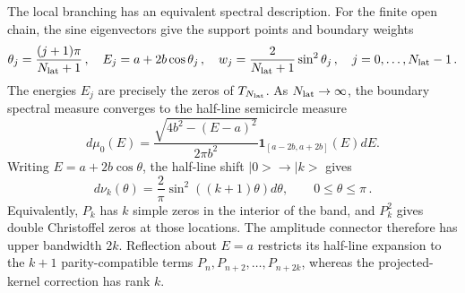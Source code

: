 \documentclass[a4paper,11pt]{article}
\def\ket#1{|#1>}%
\def\dd{d}%
\theoremstyle{definition}
\theoremstyle{remark}
\newcommand{\ket}[1]{|#1\rangle}
\newcommand{\dd}{\mathrm d}
\begin{document}
The local branching has an equivalent spectral description. For the finite open chain, the sine eigenvectors give the support points and boundary weights
\begin{equation}
   \theta_j=\frac{(j+1)\pi}{N_{\rm lat}+1}\,,\quad
   E_j=a+2b\cos\theta_j\,,\quad
   w_j=\frac{2}{N_{\rm lat}+1}\sin^2\theta_j\,,
   \quad j=0,\ldots,N_{\rm lat}-1\,.
   \label{eq:tight-binding-spectrum-main}
\end{equation}
The energies $E_j$ are precisely the zeros of $T_{N_{\rm lat}}$. As \(N_{\rm lat}\to\infty\), the boundary spectral measure converges to the half-line semicircle measure
\begin{equation}
   \dd\mu_0(E)=
   \frac{\sqrt{4b^2-(E-a)^2}}{2\pi b^2}
   \boldsymbol 1_{[a-2b,a+2b]}(E)\dd E.
   \label{eq:tight-binding-halfline-measure-main}
\end{equation}
Writing \(E=a+2b\cos\theta\), the half-line shift \(\ket0\to\ket k\) gives
\begin{equation}
   \dd\nu_k(\theta)=\frac{2}{\pi}\sin^2((k+1)\theta)\dd\theta,
   \qquad 0\le\theta\le\pi\,.
   \label{eq:tight-binding-shifted-theta-main}
\end{equation}
Equivalently, \(P_k\) has \(k\) simple zeros in the interior of the band,
and \(P_k^2\) gives double Christoffel zeros at those locations.  The
amplitude connector therefore has upper bandwidth \(2k\).  Reflection
about \(E=a\) restricts its half-line expansion to the \(k+1\)
parity-compatible terms \(P_n,P_{n+2},\ldots,P_{n+2k}\), whereas the
projected-kernel correction has rank \(k\).
\end{document}
